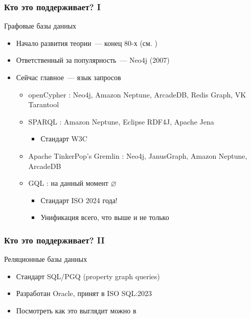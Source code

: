 \documentclass[
    aspectratio=169,
]{beamer}
\begin{document}
\begin{frame}
    \frametitle{Кто это поддерживает? I}

    Графовые базы данных
    \begin{itemize}
        \item Начало развития теории~--- конец 80-х (см. \cite[35]{bonifati_querying_2018})
        \item Ответственный за популярность~--- Neo4j (2007)
        \item Сейчас главное~--- язык запросов
              \begin{itemize}
                  \item openCypher \cite{neo4j_opencypher_nodate}: Neo4j, Amazon Neptune, ArcadeDB, Redis Graph, VK Tarantool
                  \item SPARQL \cite{w3c_sparql_nodate}: Amazon Neptune, Eclipse RDF4J, Apache Jena
                        \begin{itemize}
                            \item Стандарт W3C
                        \end{itemize}
                  \item Apache TinkerPop's Gremlin \cite{apache_tinkerpop_apache_nodate}: Neo4j, JanusGraph, Amazon Neptune, ArcadeDB
                  \item GQL \cite{isoiec_39075_information_nodate}: на данный момент $\varnothing$
                        \begin{itemize}
                            \item Стандарт ISO 2024 года!
                            \item Унификация всего, что выше и не только
                        \end{itemize}
              \end{itemize}
    \end{itemize}


\end{frame}

\begin{frame}
    \frametitle{Кто это поддерживает? II}
    Реляционные базы данных
    \begin{itemize}
        \item Стандарт SQL/PGQ (property graph queries)
        \item Разработан Oracle, принят в ISO SQL:2023 \parencite{melton_information_2023}
        \item Посмотреть как это выглядит можно в \cite{deutsch_graph_2021}
    \end{itemize}

\end{frame}
\end{document}
